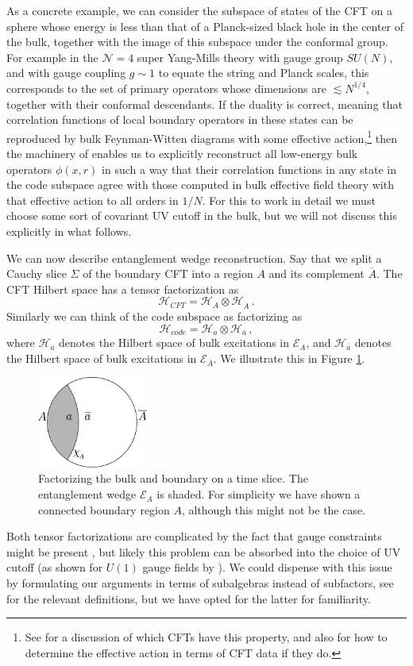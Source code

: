 \documentclass[aps,nofootinbib,longbibliography,superscriptaddress,12pt]{revtex4-1}
\newcommand{\be}{\begin{equation}}
\newcommand{\ee}{\end{equation}}
\newcommand{\EA}{\mathcal{E}_A}
\newcommand{\Ab}{\overline{A}}
\newcommand{\HA}{\mathcal{H}_A}
\newcommand{\HAb}{\mathcal{H}_{\overline{A}}}
\newcommand{\Hc}{\mathcal{H}_{code}}
\newcommand{\Ha}{\mathcal{H}_a}
\newcommand{\Hab}{\mathcal{H}_{\overline{a}}}
\newcommand{\bfig}{\begin{figure}\begin{center}}
\newcommand{\efig}{\end{center}\end{figure}}
\begin{document}
As a concrete example, we can consider the subspace of states of the CFT on a sphere whose energy is less than that of a Planck-sized black hole in the center of the bulk, together with the image of this subspace under the conformal group.  For example in the $\mathcal{N}=4$ super Yang-Mills theory with gauge group $SU(N)$, and with gauge coupling $g\sim 1$ to equate the string and Planck scales, this corresponds to the set of primary operators whose dimensions are $\lesssim N^{1/4}$, together with their conformal descendants.  If the duality is correct, meaning that correlation functions of local boundary operators in these states can be reproduced by bulk Feynman-Witten diagrams with some effective action,\footnote{See \cite{Heemskerk:2009pn} for a discussion of which CFTs have this property, and also for how to determine the effective action in terms of CFT data if they do.} then the machinery of \cite{Banks:1998dd,Hamilton:2006az,Kabat:2011rz,Heemskerk:2012mn,Kabat:2012hp,Heemskerk:2012np,Morrison:2014jha} enables us to explicitly reconstruct all low-energy bulk operators $\phi(x,r)$ in such a way that their correlation functions in any state in the code subspace agree with those computed in bulk effective field theory with that effective action to all orders in $1/N$.  For this to work in detail we must choose some sort of covariant UV cutoff in the bulk, but we will not discuss this explicitly in what follows.

We can now describe entanglement wedge reconstruction.  Say that we split a Cauchy slice $\Sigma$ of the boundary CFT into a region $A$ and its complement $\Ab$.  The CFT Hilbert space has a tensor factorization as
\be
\mathcal{H}_{CFT}=\HA\otimes \HAb \,.
\ee
Similarly we can think of the code subspace as factorizing as
\be\label{codefactor}
\Hc=\Ha\otimes \Hab \,,
\ee
where $\Ha$ denotes the Hilbert space of bulk excitations in $\EA$, and $\Hab$ denotes the Hilbert space of bulk excitations in $\mathcal{E}_{\overline{A}}$.  We illustrate this in Figure \ref{fig}.
\bfig
\includegraphics[height=3cm]{figure.pdf}
\caption{Factorizing the bulk and boundary on a time slice.  The entanglement wedge $\EA$ is shaded.  For simplicity we have shown a connected boundary region $A$, although this might not be the case. }\label{fig}
\efig
Both tensor factorizations are complicated by the fact that gauge constraints might be present \cite{Donnelly:2011hn,Casini:2013rba,Donnelly:2014fua,Donnelly:2015hxa,Radicevic:2015sza,Soni:2015yga,Ma:2015xes,Donnelly:2016auv}, but likely this problem can be absorbed into the choice of UV cutoff (as shown for $U(1)$ gauge fields by \cite{Harlow:2015lma}).  We could dispense with this issue by formulating our arguments in terms of subalgebras instead of subfactors, see \cite{Casini:2013rba} for the relevant definitions, but we have opted for the latter for familiarity.
\end{document}

